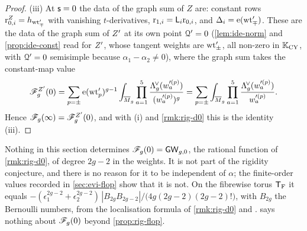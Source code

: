 \begin{proof}
(iii) At $\mathsf{s}=0$ the data of the graph sum of $Z$ are: constant rows $\mathrm{r}^{Z}_{0,i}=h_{\mathrm{wt}'_\mp}$ with vanishing $t$-derivatives, $\mathrm{r}_{1,i}=\mathsf{L}_i\mathrm{r}_{0,i}$, and $\Delta_i=\mathrm{e}(\mathrm{wt}'_\mp)$. These are the data of the graph sum of $Z'$ at its own point $\mathcal{Q}'=0$ (\cref{lem:ide-norm} and \cref{prop:ide-const} read for $Z'$, whose tangent weights are $\mathrm{wt}'_\pm$, all non-zero in $\mathbb{K}_{\mathrm{CY}}$, with $\mathcal{Q}'=0$ semisimple because $\alpha_1-\alpha_2\neq 0$), where the graph sum takes the constant-map value
\[
\mathscr{F}^{Z'}_g(0)=\sum_{p=\pm}\mathrm{e}(\mathrm{wt}'_p)^{g-1}\int_{\overline{M}_g}\prod_{a=1}^{5}\frac{\Lambda^{\!\vee}_g(w'^{(p)}_a)}{(w'^{(p)}_a)^{g}}=\sum_{p=\pm}\int_{\overline{M}_g}\prod_{a=1}^{5}\frac{\Lambda^{\!\vee}_g(w'^{(p)}_a)}{w'^{(p)}_a}.
\]
Hence $\mathscr{F}_g(\infty)=\mathscr{F}^{Z'}_g(0)$, and with (i) and \cref{rmk:rig-d0} this is the identity (iii). 
\end{proof}

\begin{rmk}
\label{rmk:rig-F0}
Nothing in this section determines $\mathscr{F}_g(0)=\mathsf{GW}_{g,0}$, the rational function of \cref{rmk:rig-d0}, of degree $2g-2$ in the weights. It is not part of the rigidity conjecture, and there is no reason for it to be independent of $\alpha$; the finite-order values recorded in \cref{sec:evi-flop} show that it is not. On the fibrewise torus $\mathsf{T}_{\mathrm{F}}$ it equals $-(\epsilon_1^{2g-2}+\epsilon_2^{2g-2})\,|B_{2g}B_{2g-2}|/\big(4g(2g-2)(2g-2)!\big)$, with $B_{2g}$ the Bernoulli numbers, from the localisation formula of \cref{rmk:rig-d0} and \cite[Theorem~4]{FP00}.   says nothing about $\mathscr{F}_g(0)$ beyond \cref{prop:rig-flop}.
\end{rmk}

